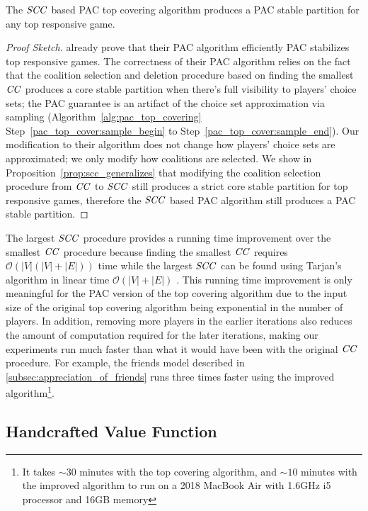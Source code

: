 \begin{theorem}
  The $\mathit{SCC}$ based PAC top covering algorithm produces a PAC stable partition
  for any top responsive game.
\end{theorem}

\begin{proof}[Proof Sketch]
 already prove that their PAC algorithm efficiently PAC
stabilizes top responsive games.
The correctness of their PAC algorithm relies on the fact that the coalition
selection and deletion procedure based on finding the smallest $\mathit{CC}$ produces
a core stable partition when there's full visibility to players' choice sets;
the PAC guarantee is an artifact of the choice set approximation via sampling
(Algorithm~\ref{alg:pac_top_covering} Step~\ref{pac_top_cover:sample_begin} to
Step~\ref{pac_top_cover:sample_end}).
Our modification to their algorithm does not change how players' choice sets
are approximated; we only modify how coalitions are selected.
We show in Proposition~\ref{prop:scc_generalizes} that modifying the coalition
selection procedure from $\mathit{CC}$ to $\mathit{SCC}$ still produces a strict core stable
partition for top responsive games, therefore the $\mathit{SCC}$ based PAC algorithm
still produces a PAC stable partition.
\end{proof}

The largest $\mathit{SCC}$ procedure provides a running time improvement over the
smallest $\mathit{CC}$ procedure because finding the smallest $\mathit{CC}$ requires
$\mathcal{O}(|V|(|V| + |E|))$ time while the largest $\mathit{SCC}$ can be found using
Tarjan's algorithm in linear time $\mathcal{O}(|V| + |E|)$ \cite{Tarjan72depthfirst}.
This running time improvement is only meaningful for the PAC version of the
top covering algorithm due to the input size of the original top covering
algorithm being exponential in the number of players.
In addition, removing more players in the earlier iterations also reduces
the amount of computation required for the later iterations, making our
experiments run much faster than what it would have been with the original
$\mathit{CC}$ procedure.
For example, the friends model described in
\autoref{subsec:appreciation_of_friends} runs three times faster using the
improved algorithm\footnote{It takes $\sim30$ minutes with the top covering
algorithm, and $\sim10$ minutes with the improved algorithm to run on a 2018
MacBook Air with 1.6GHz i5 processor and 16GB memory}.


\subsection{Handcrafted Value Function}
\label{subsec:handcrafted_value_function}

